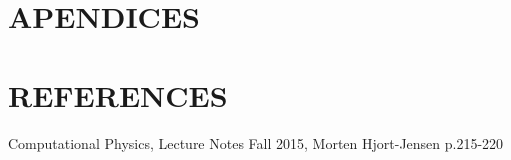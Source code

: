 \documentclass[a4paper]{article}
\begin{document}
\section{APENDICES}



\section{REFERENCES}
\begin{thebibliography}{9}
	Computational Physics, Lecture Notes Fall 2015, Morten Hjort-Jensen p.215-220
\end{thebibliography}




\end{document}
